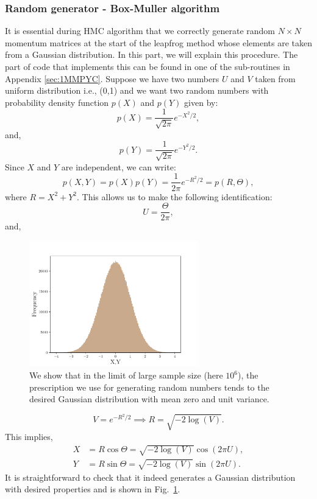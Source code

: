 \documentclass[letter,11pt]{article}
\begin{document}
\subsubsection{Random generator - Box-Muller algorithm}  
It is essential during HMC algorithm that we correctly generate random 
$N \times N$ momentum matrices at the start of the leapfrog method whose elements are taken from a Gaussian distribution. 
In this part, we will explain this procedure. The part of code that implements this can be found in one of the sub-routines in 
Appendix \ref{sec:1MMPYC}.  Suppose we have two numbers $U$ and $V$ taken from uniform distribution i.e., (0,1) and we 
want two random numbers with probability density function $p(X)$ and $p(Y)$ given by:
\begin{equation}
	p(X) = \frac{1}{\sqrt{2\pi}} e^{-X^2/2}, 
\end{equation}
and, 
\begin{equation}
	p(Y) = \frac{1}{\sqrt{2\pi}} e^{-Y^2/2} .
\end{equation}
Since $X$ and $Y$ are independent, we can write:
\begin{equation}
	p(X,Y) = p(X) p(Y) = \frac{1}{2\pi} e^{-R^2/2} = p(R, \Theta),  
\end{equation}
where $R = X^2 + Y^2$. This allows us to make the following identification:
\begin{equation}
	U = \frac{\Theta}{2\pi}, 
\end{equation}
and, 
\begin{figure}[htbp] 
	\centering 
	\includegraphics[width=0.65\textwidth]{figs/testRN.pdf}
	\caption{\label{fig:RN}We show that in the limit of large sample size (here $10^6$), the prescription we use for 
	generating random numbers tends to the desired Gaussian distribution with mean zero and unit variance.}
\end{figure}
\begin{equation}
	V = e^{-R^2/2} \implies R = \sqrt{-2 \log(V)}. 
\end{equation}
This implies, 
\begin{align}
	X &= R \cos \Theta = \sqrt{-2 \log(V)} \cos(2 \pi U), \\
	Y &= R \sin \Theta = \sqrt{-2 \log(V)} \sin(2 \pi U).
\end{align}
It is straightforward to check that it indeed generates a Gaussian distribution with desired properties and is 
shown in Fig.~\ref{fig:RN}.
\end{document}
